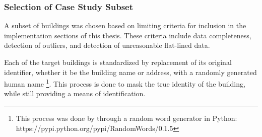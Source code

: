 \subsubsection{Selection of Case Study Subset}
\label{casestudysubset}

A subset of buildings was chosen based on limiting criteria for inclusion in the implementation sections of this thesis. These criteria include data completeness, detection of outliers, and detection of unreasonable flat-lined data.

Each of the target buildings is standardized by replacement of its original identifier, whether it be the building name or address, with a randomly generated human name \footnote{This process was done by through a random word generator in Python: https://pypi.python.org/pypi/RandomWords/0.1.5}. This process is done to mask the true identity of the building, while still providing a means of identification.